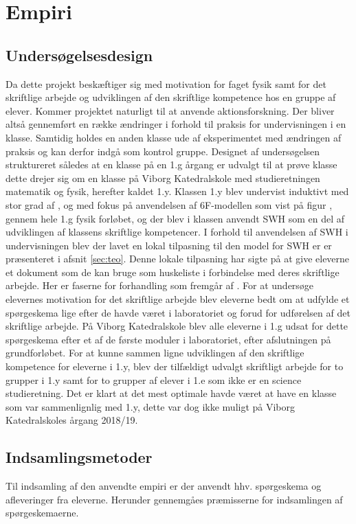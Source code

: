 \chapter{Empiri}
\label{Ch:3}

\section{Undersøgelsesdesign}
\label{sec:und}
Da dette projekt beskæftiger sig med motivation for faget fysik samt for det skriftlige arbejde og udviklingen af den skriftlige kompetence hos en gruppe af elever. Kommer projektet naturligt til at anvende aktionsforskning. Der bliver altså gennemført en række ændringer i forhold til praksis for undervisningen i en klasse. Samtidig holdes en anden klasse ude af eksperimentet med ændringen af praksis og kan derfor indgå som kontrol gruppe. Designet af undersøgelsen struktureret således at en klasse på en 1.g årgang er udvalgt til at prøve klasse dette drejer sig om en klasse på Viborg Katedralskole med studieretningen matematik og fysik, herefter kaldet 1.y. Klassen 1.y blev undervist induktivt med stor grad af \ib{}, og med fokus på anvendelsen af 6F-modellen som vist på figur  , gennem hele 1.g fysik forløbet, og der blev i klassen anvendt SWH som en del af udviklingen af klassens skriftlige kompetencer. I forhold til anvendelsen af SWH i undervisningen blev der lavet en lokal tilpasning til den model for SWH er er præsenteret i afsnit \vref{sec:teo}. Denne lokale tilpasning har sigte på at give eleverne et dokument som de kan bruge som huskeliste i forbindelse med deres skriftlige arbejde. Her er faserne for forhandling som fremgår af . For at undersøge elevernes motivation for det skriftlige arbejde blev eleverne bedt om at udfylde et spørgeskema lige efter de havde været i laboratoriet og forud for udførelsen af det skriftlige arbejde. På Viborg Katedralskole blev alle eleverne i 1.g udsat for dette spørgeskema efter et af de første moduler i laboratoriet, efter afslutningen på grundforløbet. 
For at kunne sammen ligne udviklingen af den skriftlige kompetence for eleverne i 1.y, blev der tilfældigt udvalgt skriftligt arbejde for to grupper i 1.y samt for to grupper af elever i 1.e som ikke er en science studieretning. Det er klart at det mest optimale havde været at have en klasse som var sammenlignlig med 1.y, dette var dog ikke muligt på Viborg Katedralskoles årgang 2018/19.

\section{Indsamlingsmetoder}
\label{sec:ind}
Til indsamling af den anvendte empiri er der anvendt hhv. spørgeskema og afleveringer fra eleverne. Herunder gennemgåes præmisserne for indsamlingen af spørgeskemaerne.

